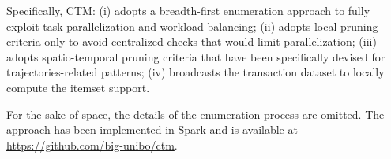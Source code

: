 \documentclass[
]{ceurart}
\begin{document}
Specifically, CTM:
(i) adopts a breadth-first enumeration approach to fully exploit task parallelization and workload balancing;
(ii) adopts local pruning criteria only to avoid centralized checks that would limit parallelization;
(iii) adopts spatio-temporal pruning criteria that have been specifically devised for trajectories-related patterns;
(iv) broadcasts the transaction dataset %
to locally compute the itemset support.

For the sake of space, the details of the enumeration process are omitted.
The approach has been implemented in Spark and is available at \url{https://github.com/big-unibo/ctm}.


\end{document}
